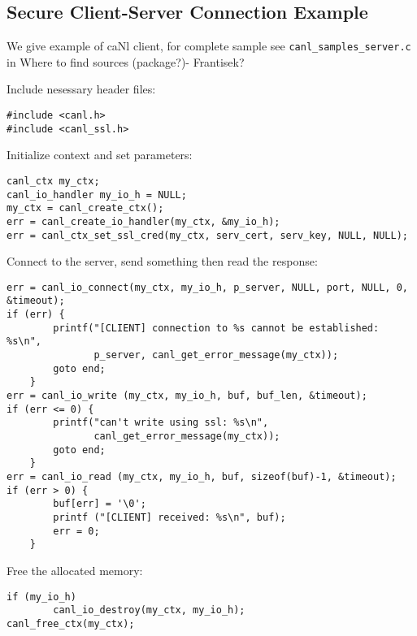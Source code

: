 \subsection{Secure Client-Server Connection Example}
We give example of caNl client, for complete sample see 
\verb'canl_samples_server.c' in 
\TODO Where to find sources (package?)- Frantisek?

Include nesessary header files:
\begin{lstlisting}
#include <canl.h>
#include <canl_ssl.h>
\end{lstlisting}

Initialize context and set parameters:
\begin{lstlisting}
canl_ctx my_ctx;
canl_io_handler my_io_h = NULL;
my_ctx = canl_create_ctx();
err = canl_create_io_handler(my_ctx, &my_io_h);
err = canl_ctx_set_ssl_cred(my_ctx, serv_cert, serv_key, NULL, NULL);
\end{lstlisting}

Connect to the server, send something then read the response:

\begin{lstlisting}
err = canl_io_connect(my_ctx, my_io_h, p_server, NULL, port, NULL, 0, &timeout);
if (err) {
        printf("[CLIENT] connection to %s cannot be established: %s\n",
               p_server, canl_get_error_message(my_ctx));
        goto end;
    }
err = canl_io_write (my_ctx, my_io_h, buf, buf_len, &timeout);
if (err <= 0) {
        printf("can't write using ssl: %s\n",
               canl_get_error_message(my_ctx));
        goto end;
    }
err = canl_io_read (my_ctx, my_io_h, buf, sizeof(buf)-1, &timeout);
if (err > 0) {
        buf[err] = '\0';
        printf ("[CLIENT] received: %s\n", buf);
        err = 0;
    }
\end{lstlisting}

Free the allocated memory:

\begin{lstlisting}
if (my_io_h)
        canl_io_destroy(my_ctx, my_io_h);
canl_free_ctx(my_ctx);
\end{lstlisting}
